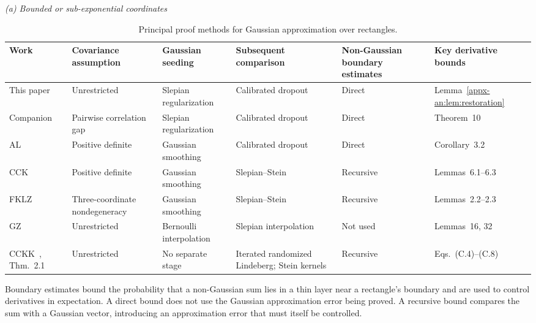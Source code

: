 \documentclass[11pt,letterpaper]{article}
\theoremstyle{remark}
\begin{document}
\begin{table}[!htb]

\centering
\small
\setlength{\tabcolsep}{4pt}
\renewcommand{\arraystretch}{1.1}
\caption{Principal proof methods for Gaussian approximation over rectangles.}
\label{tab:proof-comparison}
\smallskip
\textit{(a) Bounded or sub-exponential coordinates}\par\smallskip
{\setlength{\tabcolsep}{3pt}
\begin{tabularx}{\textwidth}{@{}>{\raggedright\arraybackslash}p{}
 >{\raggedright\arraybackslash}p{}
 >{\raggedright\arraybackslash}p{}
 >{\raggedright\arraybackslash}X
 >{\raggedright\arraybackslash}p{}
 >{\raggedright\arraybackslash}p{}@{}}
\toprule
Work & Covariance assumption & Gaussian seeding & Subsequent comparison & Non-Gaussian boundary estimates & Key derivative bounds \\
\midrule
This paper & Unrestricted & Slepian regularization & Calibrated dropout & Direct & Lemma~\ref{appx-an:lem:restoration} \\[2pt]
Companion \cite{CorrelationGap} & Pairwise correlation gap & Slepian regularization & Calibrated dropout & Direct & Theorem~10 \\[2pt]
AL~\cite{AL} & Positive definite & Gaussian smoothing & Calibrated dropout & Direct & Corollary~3.2 \\[2pt]
CCK~\cite{CCK} & Positive definite & Gaussian smoothing & Slepian--Stein & Recursive & Lemmas~6.1--6.3 \\[2pt]
FKLZ~\cite{FKLZ} & Three-coordinate nondegeneracy & Gaussian smoothing & Slepian--Stein & Recursive & Lemmas~2.2--2.3 \\[2pt]
GZ~\cite{GaoZhang} & Unrestricted & Bernoulli interpolation & Slepian interpolation & Not used & Lemmas~16, 32 \\[2pt]
CCKK~\cite{CCKK2022}, Thm.~2.1 & Unrestricted & No separate stage & Iterated randomized Lindeberg; Stein kernels & Recursive & Eqs.~(C.4)--(C.8) \\
\bottomrule
\end{tabularx}}
\smallskip
{\footnotesize\raggedright
Boundary estimates bound the probability that a non-Gaussian sum lies in a
thin layer near a rectangle's boundary and are used to control
derivatives in expectation. A direct bound does not use the Gaussian
approximation error being proved. A recursive bound compares the sum
with a Gaussian vector, introducing an approximation error that must
itself be controlled.\par}


\end{table}
\end{document}
